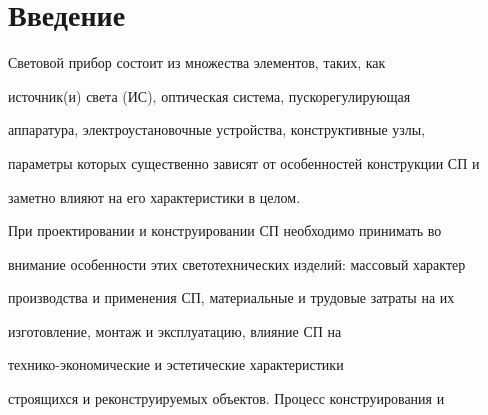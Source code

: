 




 










      \thispagestyle{headings}





      


            \label{st\stat}


            


            \vspace*{-12pt}





\section{Введение}





  Световой прибор  состоит из множества элементов, таких, как 


источник(и) света (ИС), оптическая система, пускорегулирующая 


аппаратура, электроустановочные устройства, конструктивные узлы, 


параметры которых существенно зависят от особенностей конструкции СП и 


заметно влияют на его характеристики в целом.


  


  При проектировании и конструировании СП необходимо принимать во 


внимание особенности этих светотехнических изделий: массовый характер 


производства и применения СП, материальные и трудовые затраты на их 


изготовление, монтаж и эксплуатацию, влияние СП на 


  тех\-ни\-ко-эко\-но\-ми\-че\-ские и эстетические характеристики 


строящихся и реконструируемых объектов. Процесс конструирования и 


